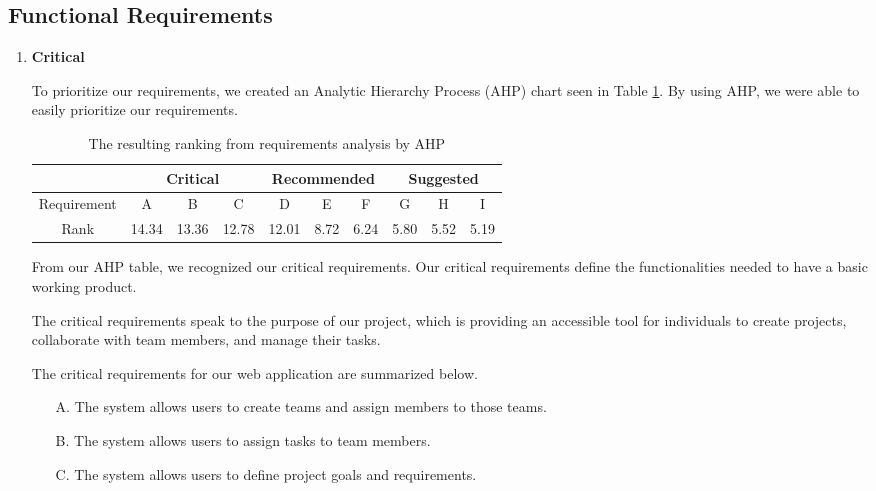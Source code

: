 \subsection{Functional Requirements}
\begin{enumerate}
\item \textbf{Critical}
\par To prioritize our requirements, we created an Analytic Hierarchy Process (AHP) chart seen in Table \ref{ahp}. By using AHP, we were able to easily prioritize our requirements.
\FloatBarrier
\begin{table}[ht]
\centering
\begin{tabular}{|c|c|c|c|c|c|c|c|c|c|}
	\hline
	\multicolumn{1}{|c|}{} & \multicolumn{3}{|c|}{\bfseries Critical} & \multicolumn{3}{|c|}{\bfseries Recommended} & \multicolumn{3}{|c|}{\bfseries Suggested} \\ 
	\hline
	Requirement & A & B & C & D & E & F & G & H & I  \\
	\hline
	Rank & 14.34 & 13.36 & 12.78 & 12.01 & 8.72 & 6.24 & 5.80 & 5.52 & 5.19 \\
	\hline
\end{tabular}
\caption{The resulting ranking from requirements analysis by AHP}
\label{ahp}
\end{table}
\FloatBarrier

\par From our AHP table, we recognized our critical requirements. Our critical requirements define the functionalities needed to have a basic working product. 

\par The critical requirements speak to the purpose of our project, which is providing an accessible tool for individuals to create projects, collaborate with team members, and manage their tasks.

\par The critical requirements for our web application are summarized below.
	\begin{enumerate}
	\item[A.] The system allows users to create teams and assign members to those teams.
	\item[B.] The system allows users to assign tasks to team members.
	\item[C.] The system allows users to define project goals and requirements.


\end{enumerate}
\end{enumerate}
